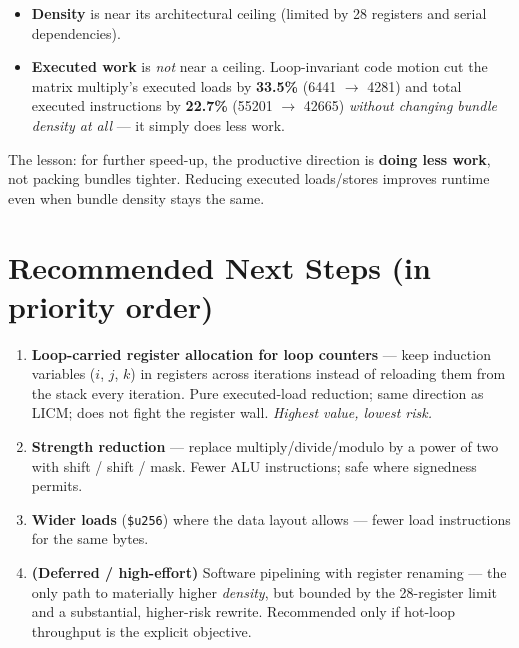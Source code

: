 \documentclass[11pt,a4paper]{article}
\begin{document}
\begin{itemize}[leftmargin=*]
  \item \textbf{Density} is near its architectural ceiling (limited by 28 registers and
        serial dependencies).
  \item \textbf{Executed work} is \emph{not} near a ceiling. Loop-invariant code motion cut
        the matrix multiply's executed loads by \textbf{33.5\%} (6441 $\to$ 4281) and total
        executed instructions by \textbf{22.7\%} (55201 $\to$ 42665) \emph{without changing
        bundle density at all} --- it simply does less work.
\end{itemize}

The lesson: for further speed-up, the productive direction is \textbf{doing less work}, not
packing bundles tighter. Reducing executed loads/stores improves runtime even when bundle
density stays the same.

\section{Recommended Next Steps (in priority order)}

\begin{enumerate}[leftmargin=*]
  \item \textbf{Loop-carried register allocation for loop counters} --- keep induction
        variables ($i$, $j$, $k$) in registers across iterations instead of reloading them
        from the stack every iteration. Pure executed-load reduction; same direction as
        LICM; does not fight the register wall. \emph{Highest value, lowest risk.}
  \item \textbf{Strength reduction} --- replace multiply/divide/modulo by a power of two
        with shift / shift / mask. Fewer ALU instructions; safe where signedness permits.
  \item \textbf{Wider loads} (\texttt{\$u256}) where the data layout allows --- fewer load
        instructions for the same bytes.
  \item \textbf{(Deferred / high-effort)} Software pipelining with register renaming ---
        the only path to materially higher \emph{density}, but bounded by the 28-register
        limit and a substantial, higher-risk rewrite. Recommended only if hot-loop
        throughput is the explicit objective.
\end{enumerate}
\end{document}

